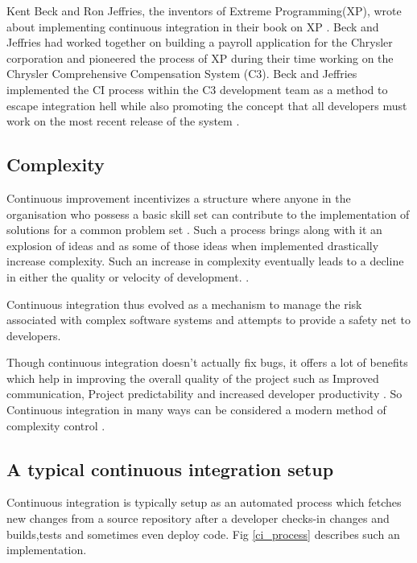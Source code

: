\documentclass[12pt,conference]{IEEEtran}
\begin{document}
Kent Beck and Ron Jeffries, the inventors of Extreme Programming(XP), wrote about implementing continuous integration in their book on XP \cite{astesiano_fundamental_1998}. Beck and Jeffries had worked together on building a payroll application for the Chrysler corporation and pioneered the process of XP during their time working on the Chrysler Comprehensive Compensation System (C3). Beck and Jeffries implemented the CI process within the C3 development team as a method to escape integration hell while also promoting the concept that all developers must work on the most recent release of the system \cite{cunningham_cunningham_2011}.

\subsection*{Complexity}
Continuous improvement incentivizes a structure where anyone in the organisation who possess  a basic skill set can contribute to the implementation of solutions for a common problem set \cite{bessant_rediscovering_1994}. Such a process brings along with it an explosion of ideas and as some of those ideas when implemented drastically increase complexity. Such an increase in complexity eventually leads to a decline in either the quality or velocity of development. \cite{zaytsev_increasing_2013}. 

Continuous integration thus evolved as a mechanism to manage the risk associated with complex software systems \cite{zaytsev_increasing_2013} and  attempts to provide a safety net \cite{fowler_continuous_2006} to developers. 

Though continuous integration doesn't actually fix bugs, it offers a lot of benefits which help in improving the overall quality of the project such as Improved communication, Project predictability and increased developer productivity \cite{sta_ahl_experienced_2013}. So Continuous integration in many ways can be considered a modern method of complexity control \cite{beck_extreme_2000}.

\subsection*{A typical continuous integration setup}

Continuous integration is typically setup as an automated process which fetches new changes from a source repository after a developer checks-in changes and builds,tests and sometimes even deploy code. Fig \ref{ci_process} describes such an implementation.
\end{document}
